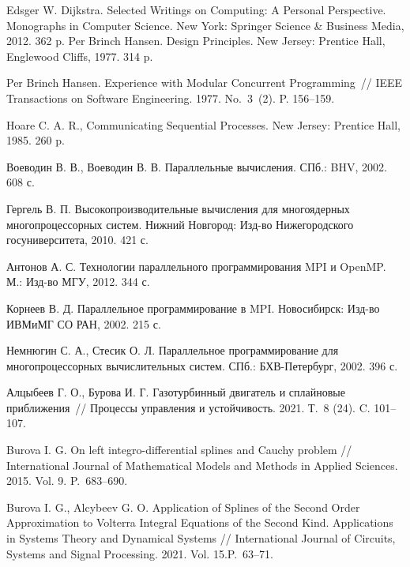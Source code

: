 \documentclass{spisok-article}
\begin{document}
\begin{thebibliography}{88}

Edsger W. Dijkstra. Selected Writings on Computing: A Personal Perspective. Monographs in Computer Science. New York: Springer Science \& Business Media, 2012. 362 p.
Per Brinch Hansen. Design Principles. New Jersey: Prentice Hall, Englewood Cliffs, 1977. 314 p.

Per Brinch Hansen. Experience with Modular Concurrent Programming~// IEEE Transactions on Software Engineering. 1977. No.~3~(2). P. 156--159.

Hoare C. A. R., Communicating Sequential Processes. New Jersey: Prentice Hall, 1985. 260 p.

Воеводин В. В., Воеводин В. В. Параллельные вычисления. СПб.: BHV, 2002. 608 с.

Гергель В. П. Высокопроизводительные вычисления для многоядерных многопроцессорных систем. Нижний Новгород: Изд-во Нижегородского госуниверситета, 2010. 421 с.

Антонов А. С. Технологии параллельного программирования MPI и OpenMP. М.: Изд-во МГУ, 2012. 344 с.

Корнеев В. Д. Параллельное программирование в MPI. Новосибирск: Изд-во ИВМиМГ СО РАН, 2002. 215 с.

Немнюгин С. А., Стесик О. Л. Параллельное программирование для многопроцессорных вычислительных систем. СПб.: БХВ-Петербург, 2002. 396 с.

Алцыбеев Г. О., Бурова И. Г. Газотурбинный двигатель и сплайновые приближения~// Процессы управления и устойчивость. 2021. Т.~8 (24). C. 101--107.

Burova I. G. On left integro-differential splines and Cauchy problem // International Journal of Mathematical Models and Methods in Applied Sciences. 2015. Vol. 9. P.~683--690.

Burova I. G., Alcybeev G. O. Application of Splines of the Second Order Approximation to Volterra Integral Equations of the Second Kind. Applications in Systems Theory and Dynamical Systems // International Journal of Circuits, Systems and Signal Processing. 2021. Vol. 15.\linebreak P.~63--71.

\end{thebibliography}
\end{document}
